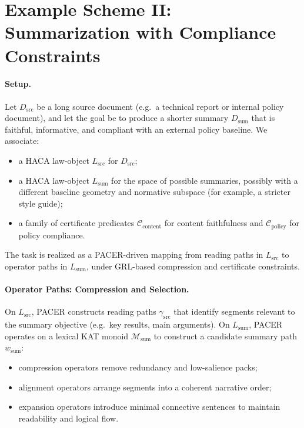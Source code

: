 \documentclass[11pt]{book}
\theoremstyle{plain}
\theoremstyle{definition}
\theoremstyle{remark}
\begin{document}
\section{Example Scheme II: Summarization with Compliance Constraints}


\paragraph{Setup.}
Let $D_{\mathrm{src}}$ be a long source document (e.g.\ a technical
report or internal policy document), and let the goal be to produce a
shorter summary $D_{\mathrm{sum}}$ that is faithful, informative, and
compliant with an external policy baseline. We associate:
\begin{itemize}
  \item a HACA law-object $L_{\mathrm{src}}$ for $D_{\mathrm{src}}$;
  \item a HACA law-object $L_{\mathrm{sum}}$ for the space of possible
        summaries, possibly with a different baseline geometry and
        normative subspace (for example, a stricter style guide);
  \item a family of certificate predicates
        $\mathcal{C}_{\mathrm{content}}$ for content faithfulness and
        $\mathcal{C}_{\mathrm{policy}}$ for policy compliance.
\end{itemize}
The task is realized as a PACER-driven mapping from reading paths in
$L_{\mathrm{src}}$ to operator paths in $L_{\mathrm{sum}}$, under
GRL-based compression and certificate constraints.

\paragraph{Operator Paths: Compression and Selection.}
On $L_{\mathrm{src}}$, PACER constructs reading paths
$\gamma_{\mathrm{src}}$ that identify segments relevant to the summary
objective (e.g.\ key results, main arguments). On $L_{\mathrm{sum}}$,
PACER operates on a lexical KAT monoid
$\mathcal{M}_{\mathrm{sum}}$ to construct a candidate summary path
$w_{\mathrm{sum}}$:
\begin{itemize}
  \item compression operators remove redundancy and low-salience
        packs;
  \item alignment operators arrange segments into a coherent
        narrative order;
  \item expansion operators introduce minimal connective sentences
        to maintain readability and logical flow.
\end{itemize}
\end{document}

